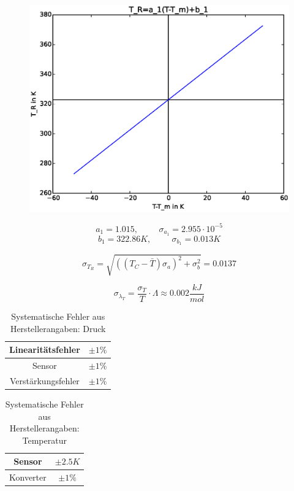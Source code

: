 \documentclass[11pt]{beamer}
\begin{document}
\begin{frame}
\begin{figure}[H]
\centering
\includegraphics[scale=0.4]{Bilder/gewollteFunktion.eps}
\end{figure}
\begin{equation*}
a_1=1.015, \hspace{1cm} \sigma_{a_1}=2.955 \cdot 10^{-5}
\end{equation*}
\begin{equation*}
b_1=322.86 K, \hspace{1cm} \sigma_{b_1}=0.013 K
\end{equation*}
\end{frame}

\begin{frame}
\begin{equation*}
\sigma_{T_{R}} = \sqrt{((T_C-\bar{T}) \sigma_a)^2+\sigma_b^2}=0.0137
\end{equation*}

\begin{equation*}
\sigma_{\lambda_{T}}=\frac{\sigma_T}{T}\cdot \Lambda \approx 0.002 \frac{kJ}{mol}
\end{equation*}
\begin{table}[H]\centering
\caption{Systematische Fehler aus Herstellerangaben: Druck}
\begin{tabular}{|c|c|}
\hline 
Linearitätsfehler & $\pm 1\%$ \\ 
\hline 
Sensor & $\pm 1\%$ \\ 
\hline 
Verstärkungsfehler & $\pm 1\%$ \\ 
\hline 
\end{tabular}
\end{table}


\begin{table}[H]\centering
\caption{Systematische Fehler aus Herstellerangaben: Temperatur}
\begin{tabular}{|c|c|}
\hline 
Sensor & $\pm 2.5 K $ \\ 
\hline 
Konverter & $\pm 1\%$ \\ 
\hline 
\end{tabular}
\end{table}
\end{frame}
\end{document}
